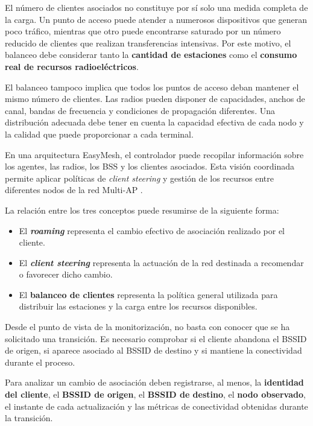 El número de clientes asociados no constituye por sí solo una medida
completa de la carga. Un punto de acceso puede atender a numerosos
dispositivos que generan poco tráfico, mientras que otro puede encontrarse
saturado por un número reducido de clientes que realizan transferencias
intensivas. Por este motivo, el balanceo debe considerar tanto la
\textbf{cantidad de estaciones} como el
\textbf{consumo real de recursos radioeléctricos}.

El balanceo tampoco implica que todos los puntos de acceso deban mantener
el mismo número de clientes. Las radios pueden disponer de capacidades,
anchos de canal, bandas de frecuencia y condiciones de propagación
diferentes. Una distribución adecuada debe tener en cuenta la capacidad
efectiva de cada nodo y la calidad que puede proporcionar a cada
terminal.

En una arquitectura EasyMesh, el controlador puede recopilar información
sobre los agentes, las radios, los BSS y los clientes asociados. Esta
visión coordinada permite aplicar políticas de
\textit{client steering} y gestión de los recursos entre diferentes
nodos de la red Multi-AP \cite{wifi_alliance_easymesh}.

La relación entre los tres conceptos puede resumirse de la siguiente
forma:

\begin{itemize}
    \item El \textbf{\textit{roaming}} representa el cambio efectivo de
    asociación realizado por el cliente.

    \item El \textbf{\textit{client steering}} representa la actuación
    de la red destinada a recomendar o favorecer dicho cambio.

    \item El \textbf{balanceo de clientes} representa la política general
    utilizada para distribuir las estaciones y la carga entre los
    recursos disponibles.
\end{itemize}

Desde el punto de vista de la monitorización, no basta con conocer que se
ha solicitado una transición. Es necesario comprobar si el cliente
abandona el BSSID de origen, si aparece asociado al BSSID de destino y si
mantiene la conectividad durante el proceso.

Para analizar un cambio de asociación deben registrarse, al menos, la
\textbf{identidad del cliente}, el \textbf{BSSID de origen}, el
\textbf{BSSID de destino}, el \textbf{nodo observado}, el instante de
cada actualización y las métricas de conectividad obtenidas durante la
transición.

